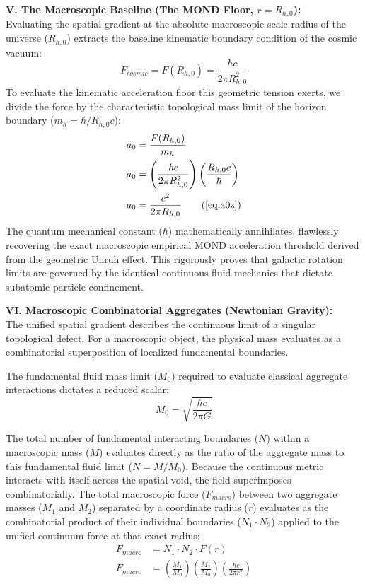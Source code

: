 \documentclass[11pt, a4paper]{article}
\begin{document}
\textbf{V. The Macroscopic Baseline (The MOND Floor, $r = R_{h,0}$):} \\
Evaluating the spatial gradient at the absolute macroscopic scale radius of the universe ($R_{h,0}$) extracts the baseline kinematic boundary condition of the cosmic vacuum:
\begin{equation}
    F_{cosmic} = F(R_{h,0}) = \frac{\hbar c}{2\pi R_{h,0}^2} 
\end{equation}
To evaluate the kinematic acceleration floor this geometric tension exerts, we divide the force by the characteristic topological mass limit of the horizon boundary ($m_h = \hbar / R_{h,0} c$):
\begin{align}
    a_0 &= \frac{F(R_{h,0})}{m_h} \nonumber \\
    a_0 &= \left( \frac{\hbar c}{2\pi R_{h,0}^2} \right) \left( \frac{R_{h,0} c}{\hbar} \right) \nonumber \\
    a_0 &= \frac{c^2}{2\pi R_{h,0}} \tag{\ref{eq:a0z}}
\end{align}
The quantum mechanical constant ($\hbar$) mathematically annihilates, flawlessly recovering the exact macroscopic empirical MOND acceleration threshold derived from the geometric Unruh effect. This rigorously proves that galactic rotation limits are governed by the identical continuous fluid mechanics that dictate subatomic particle confinement.

\textbf{VI. Macroscopic Combinatorial Aggregates (Newtonian Gravity):} \\
The unified spatial gradient   describes the continuous limit of a singular topological defect. For a macroscopic object, the physical mass evaluates as a combinatorial superposition of localized fundamental boundaries.

The fundamental fluid mass limit ($M_0$) required to evaluate classical aggregate interactions dictates a reduced scalar:
\begin{equation}
    M_0 = \sqrt{\frac{\hbar c}{2\pi G}} 
\end{equation}

The total number of fundamental interacting boundaries ($N$) within a macroscopic mass ($M$) evaluates directly as the ratio of the aggregate mass to this fundamental fluid limit ($N = M / M_0$). Because the continuous metric interacts with itself across the spatial void, the field superimposes combinatorially. The total macroscopic force ($F_{macro}$) between two aggregate masses ($M_1$ and $M_2$) separated by a coordinate radius ($r$) evaluates as the combinatorial product of their individual boundaries ($N_1 \cdot N_2$) applied to the unified continuum force at that exact radius:
\begin{align}
    F_{macro} &= N_1 \cdot N_2 \cdot F(r) \\
    F_{macro} &= \left( \frac{M_1}{M_0} \right) \left( \frac{M_2}{M_0} \right) \left( \frac{\hbar c}{2\pi r^2} \right) \nonumber
\end{align}
\end{document}
